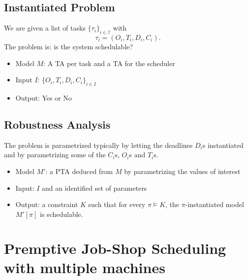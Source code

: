 \documentclass{article}
\begin{document}
\subsection{Instantiated Problem}
We are given a list of tasks $\{\tau_i\}_{i \in \mathcal{I}}$ with $$\tau_i=(O_i,T_i,D_i,C_i).$$ 
The problem is: is the system schedulable? 
\begin{itemize}
 \item Model $M$: A TA per task and a TA for the scheduler
 \item Input $I$: $\{O_i,T_i,D_i,C_i\}_{i \in I}$
 \item Output: Yes or No
\end{itemize}



\subsection{Robustness Analysis}


The problem is parametrized typically by letting the deadlines $D_i$s instantiated and by parametrizing some of the $C_i$s, $O_i$s and $T_i$s.
\begin{itemize}
 \item Model $M'$: a PTA deduced from $M$ by parametrizing the values of interest 
 \item Input: $I$ and an identified set of parameters
 \item Output: a constraint $K$ such that for every $\pi \models K$, the $\pi$-instantiated model $M'[\pi]$ is schedulable.
\end{itemize}


\section{Premptive Job-Shop Scheduling with multiple machines \cite{am02}}
\end{document}
